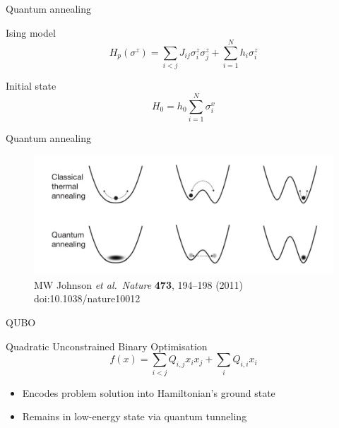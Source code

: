\documentclass[handout]{beamer}
\begin{document}
\begin{frame}{Quantum annealing}
    
    \begin{exampleblock}{Ising model}
        \begin{equation*}
            H_p(\sigma^z) = \sum_{i<j}J_{ij}\sigma^z_i \sigma^z_j + \sum_{i=1}^{N}h_i \sigma^z_i
        \end{equation*}
    \end{exampleblock}

    \begin{alertblock}{Initial state}
        \begin{equation*}
            H_0 = h_0\sum_{i=1}^{N}\sigma_i^x
        \end{equation*}
    \end{alertblock}

\end{frame}

\begin{frame}{Quantum annealing}
    \begin{figure}
        \centering
        \includegraphics[width=\textwidth]{../Figures/nature10012.png}
        \caption{MW Johnson \textit{et al.}\ \textit{Nature} \textbf{473}, 194–198 (2011) doi:10.1038/nature10012}
    \end{figure}

\end{frame}

\begin{frame}{QUBO}
    \begin{block}{Quadratic Unconstrained Binary Optimisation}
        \vspace{0.1em}
        \begin{equation*}
            f(x)=\sum_{i<j}Q_{i,j}x_ix_j + \sum_iQ_{i,i}x_i
        \end{equation*}
    \end{block}
    \begin{itemize}
        \item Encodes problem solution into Hamiltonian's ground state
        \item Remains in low-energy state via quantum tunneling
    \end{itemize}
\end{frame}
\end{document}
